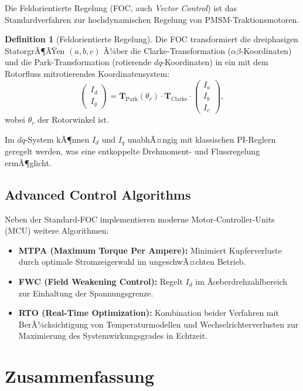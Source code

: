 ﻿\documentclass[a4paper,12pt]{article}
\theoremstyle{definition}
\newtheorem{definition}{Definition}
\begin{document}
Die Feldorientierte Regelung (FOC, auch \emph{Vector Control}) ist das
Standardverfahren zur hochdynamischen Regelung von PMSM-Traktionsmotoren.

\begin{definition}[Feldorientierte Regelung]
    Die FOC transformiert die dreiphasigen StatorgrÃ¶ÃŸen $(a, b, c)$ Ã¼ber die
    Clarke-Transformation ($\alpha\beta$-Koordinaten) und die Park-Transformation
    (rotierende $dq$-Koordinaten) in ein mit dem Rotorfluss mitrotierendes
    Koordinatensystem:
    \[
        \begin{pmatrix} I_d \\ I_q \end{pmatrix}
        = \mathbf{T}_{\mathrm{Park}}(\theta_r)
          \cdot \mathbf{T}_{\mathrm{Clarke}}
          \cdot \begin{pmatrix} I_a \\ I_b \\ I_c \end{pmatrix},
    \]
    wobei $\theta_r$ der Rotorwinkel ist.
\end{definition}

Im $dq$-System kÃ¶nnen $I_d$ und $I_q$ unabhÃ¤ngig mit klassischen PI-Reglern
geregelt werden, was eine entkoppelte Drehmoment- und Flussregelung ermÃ¶glicht.

\subsection{Advanced Control Algorithms}

Neben der Standard-FOC implementieren moderne Motor-Controller-Units (MCU)
weitere Algorithmen:

\begin{itemize}
    \item \textbf{MTPA (Maximum Torque Per Ampere):} Minimiert Kupferverluste
          durch optimale Stromzeigerwahl im ungeschwÃ¤chten Betrieb.
    \item \textbf{FWC (Field Weakening Control):} Regelt $I_d$ im Ãœberdrehzahlbereich
          zur Einhaltung der Spannungsgrenze.
    \item \textbf{RTO (Real-Time Optimization):} Kombination beider Verfahren
          mit BerÃ¼cksichtigung von Temperaturmodellen und Wechselrichterverlusten
          zur Maximierung des Systemwirkungsgrades in Echtzeit.
\end{itemize}

\section{Zusammenfassung}
\label{sec:zusammenfassung}
\end{document}
